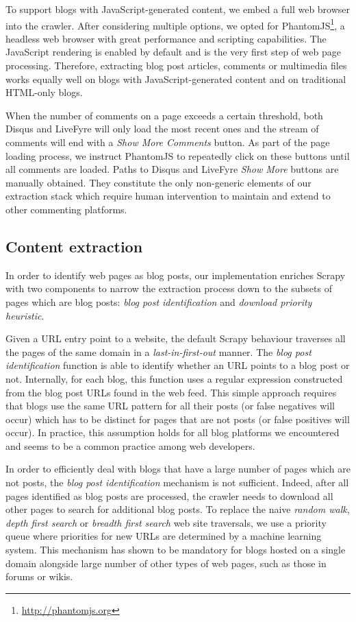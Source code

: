 To support blogs with JavaScript-generated content, we embed a full web 
browser into the crawler. After considering multiple options, we opted 
for PhantomJS\footnote{\url{http://phantomjs.org}}, a headless web 
browser with great performance and scripting capabilities. 
The JavaScript rendering is enabled by default and is the very first
step of web page processing. Therefore, 
extracting blog post articles, comments or multimedia files works equally 
well on blogs with JavaScript-generated content and on traditional 
HTML-only blogs.

When the number of comments on a page exceeds a certain threshold, both 
Disqus and LiveFyre will only load the most recent ones and the stream 
of comments will end with a \emph{Show More Comments} button. As part of 
the page loading process, we instruct PhantomJS to repeatedly click on 
these buttons until all comments are loaded. Paths to Disqus and LiveFyre 
\emph{Show More} buttons are manually obtained. They constitute the 
only non-generic elements of our extraction stack which require human 
intervention to maintain and extend to other commenting platforms.

\subsection{Content extraction}\label{enrichingscrapy}

In order to identify web pages as blog posts, our implementation enriches 
Scrapy with two components to narrow the extraction process down to the 
subsets of pages which are blog posts: \emph{blog post identification} 
and \emph{download priority heuristic}.

Given a URL entry point to a website, the default Scrapy behaviour 
traverses all the pages of the same domain in a \emph{last-in-first-out} 
manner. The \emph{blog post identification} function is able to identify 
whether an URL points to a blog post or not. Internally, for each blog, 
this function uses a regular expression constructed from the blog post 
URLs found in the web feed. This simple approach requires that blogs use 
the same URL pattern for all their posts (or false negatives will occur) 
which has to be distinct for pages that are not posts (or false positives 
will occur). In practice, this assumption holds for all blog platforms 
we encountered and seems to be a common practice among web developers.

In order to efficiently deal with blogs that have a large number of 
pages which are not posts, the \emph{blog post identification} mechanism 
is not sufficient. Indeed, after all pages identified as blog posts 
are processed, the crawler needs to download all other pages to search 
for additional blog posts. To replace the naive \emph{random walk}, 
\emph{depth first search} or \emph{breadth first search} web site 
traversals, we use a priority queue where priorities for new URLs are 
determined by a machine learning system. This mechanism has shown 
to be mandatory for blogs hosted on a single domain alongside large 
number of other types of web pages, such as those in forums or wikis.

